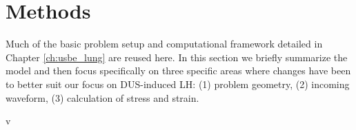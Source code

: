 \section{Methods}
Much of the basic problem setup and computational framework detailed
in Chapter \ref{ch:usbe_lung} are reused here. In this section we
briefly summarize the model and then focus specifically on three
specific areas where changes have been to better suit our focus on
\ac{DUS}-induced \ac{LH}: (1) problem geometry, (2) incoming waveform,
(3) calculation of stress and strain.

v%

